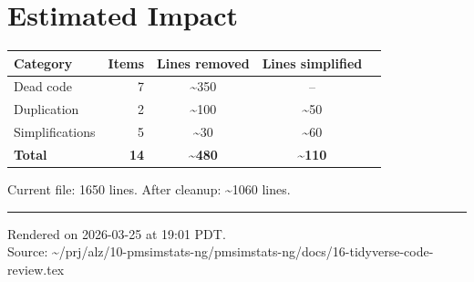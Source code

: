 \documentclass[11pt]{article}
\begin{document}
\section{Estimated Impact}

\begin{table}[htbp]
\centering
\begin{tabular}{lrccc}
\toprule
Category & Items & Lines removed & Lines simplified \\
\midrule
Dead code & 7 & \textasciitilde{}350 & -- \\
Duplication & 2 & \textasciitilde{}100 & \textasciitilde{}50 \\
Simplifications & 5 & \textasciitilde{}30 & \textasciitilde{}60 \\
\midrule
\textbf{Total} & \textbf{14} & \textbf{\textasciitilde{}480} & \textbf{\textasciitilde{}110} \\
\bottomrule
\end{tabular}
\end{table}

Current file: 1650 lines. After cleanup: \textasciitilde{}1060 lines.

\vfill
\noindent\rule{\textwidth}{0.4pt}
{\footnotesize
Rendered on 2026-03-25 at 19:01 PDT.\\
Source: \textasciitilde/prj/alz/10-pmsimstats-ng/pmsimstats-ng/docs/16-tidyverse-code-review.tex}
\end{document}
